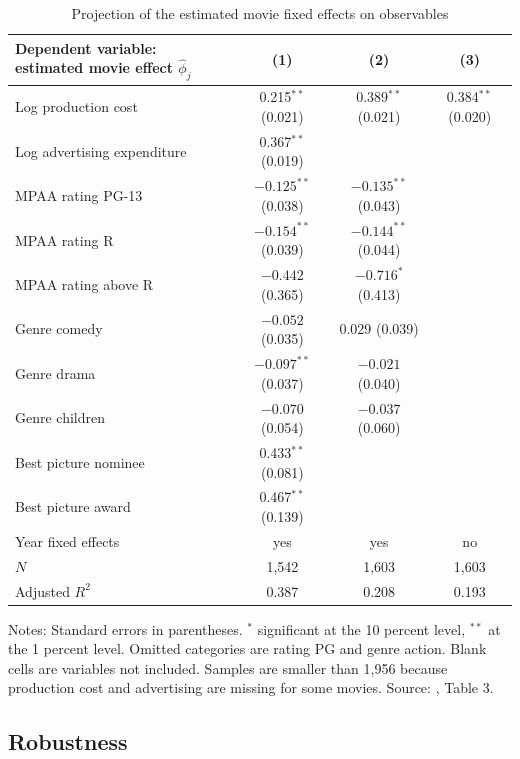 \begin{table}[htbp]
\centering
\caption{Projection of the estimated movie fixed effects on observables \citep[Table 3]{Einav2007}}
\label{tab:07-einav-fe}
\small
\begin{tabular}{lccc}
\toprule
Dependent variable: estimated movie effect $\hat\phi_j$ & (1) & (2) & (3) \\
\midrule
Log production cost & 0.215$^{**}$ (0.021) & 0.389$^{**}$ (0.021) & 0.384$^{**}$ (0.020) \\
Log advertising expenditure & 0.367$^{**}$ (0.019) & & \\
MPAA rating PG-13 & $-0.125^{**}$ (0.038) & $-0.135^{**}$ (0.043) & \\
MPAA rating R & $-0.154^{**}$ (0.039) & $-0.144^{**}$ (0.044) & \\
MPAA rating above R & $-0.442$ \phantom{$^{**}$}(0.365) & $-0.716^{*}$ \phantom{$^{*}$}(0.413) & \\
Genre comedy & $-0.052$ \phantom{$^{**}$}(0.035) & 0.029 \phantom{$^{**}$}(0.039) & \\
Genre drama & $-0.097^{**}$ (0.037) & $-0.021$ \phantom{$^{**}$}(0.040) & \\
Genre children & $-0.070$ \phantom{$^{**}$}(0.054) & $-0.037$ \phantom{$^{**}$}(0.060) & \\
Best picture nominee & 0.433$^{**}$ (0.081) & & \\
Best picture award & 0.467$^{**}$ (0.139) & & \\
Year fixed effects & yes & yes & no \\
$N$ & 1,542 & 1,603 & 1,603 \\
Adjusted $R^2$ & 0.387 & 0.208 & 0.193 \\
\bottomrule
\end{tabular}
\par\medskip
\parbox{\linewidth}{\footnotesize Notes: Standard errors in parentheses. $^{*}$ significant at the 10 percent
level, $^{**}$ at the 1 percent level. Omitted categories are rating PG and genre action. Blank cells are
variables not included. Samples are smaller than 1,956 because production cost and advertising are missing for
some movies. Source: \citet{Einav2007}, Table 3.}
\end{table}

\subsection{Robustness}\label{sec:07-einav-robust}

